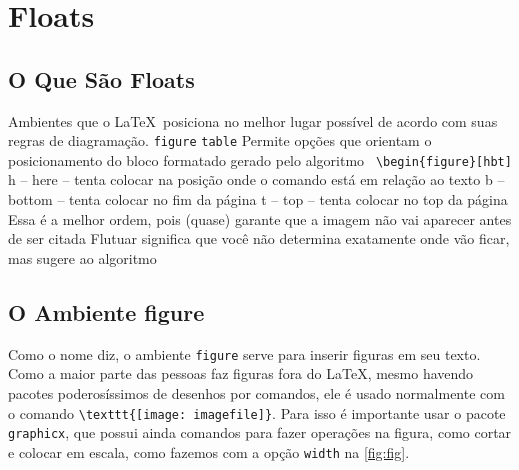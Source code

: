 \section{Floats}
\subsection{O Que São Floats}

    \begin{outline}
        \1 Ambientes que o \LaTeX\ posiciona no melhor lugar possível de acordo com suas regras de diagramação.
        \2 \lstinline|figure|
        \2 \lstinline|table|
        \1 Permite opções que orientam o posicionamento do bloco formatado gerado pelo algoritmo
        \2\lstinline| \begin{figure}[hbt]|
        \3 h -- here -- tenta colocar na posição onde o comando está em relação ao texto
        \3 b -- bottom -- tenta colocar no fim da página
        \3 t -- top -- tenta colocar no top da página
        \2 Essa é a melhor ordem, pois (quase) garante que a imagem não vai aparecer antes de ser citada
        \1 Flutuar significa que você não determina exatamente onde vão ficar, mas sugere ao algoritmo 
    \end{outline}


\subsection{O Ambiente figure}

Como o nome diz, o ambiente \lstinline|figure| serve para inserir figuras em seu texto. Como a maior parte das pessoas faz figuras fora do \LaTeX, mesmo havendo pacotes poderosíssimos de desenhos por comandos, ele é usado normalmente com o comando
\lstinline|\texttt{[image: imagefile]}|. Para isso é importante usar o pacote \lstinline|graphicx|, que possui ainda comandos para fazer operações na figura, como cortar e colocar em escala, como fazemos com a opção \lstinline|width| na \ref{fig:fig}.


